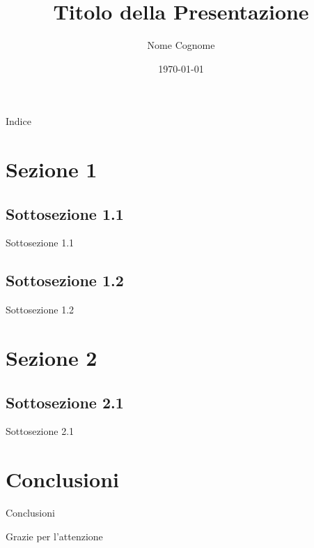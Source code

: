 \documentclass[11pt]{beamer}
\title[Short Title]{Titolo della Presentazione}
\author[Autore]{Nome Cognome}
\institute[Affiliazione]{%
  Istituzione \\
  Corso di Laurea
}
\date{\today}
\begin{document}
\begin{frame}
  \titlepage
\end{frame}

\begin{frame}{Indice}
  \tableofcontents
\end{frame}

\section{Sezione 1}
\subsection{Sottosezione 1.1}
\begin{frame}{Sottosezione 1.1}
\end{frame}

\subsection{Sottosezione 1.2}
\begin{frame}{Sottosezione 1.2}
\end{frame}

\section{Sezione 2}
\subsection{Sottosezione 2.1}
\begin{frame}{Sottosezione 2.1}
\end{frame}

\section{Conclusioni}
\begin{frame}{Conclusioni}
\end{frame}

\begin{frame}
  \centering
  {\Huge Grazie per l'attenzione}
\end{frame}
\end{document}
